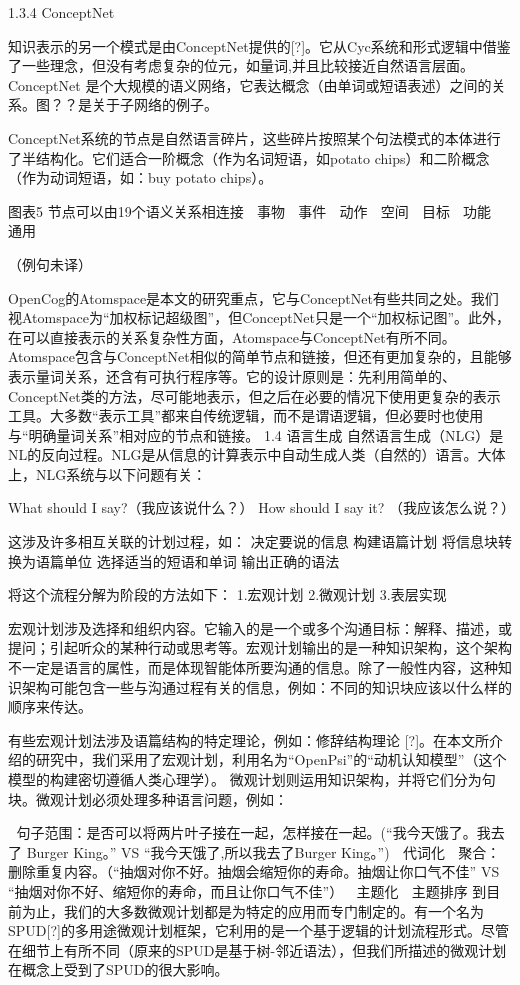 1.3.4 ConceptNet

知识表示的另一个模式是由ConceptNet提供的[?]。它从Cyc系统和形式逻辑中借鉴了一些理念，但没有考虑复杂的位元，如量词,并且比较接近自然语言层面。ConceptNet 是个大规模的语义网络，它表达概念（由单词或短语表述）之间的关系。图？？是关于子网络的例子。

ConceptNet系统的节点是自然语言碎片，这些碎片按照某个句法模式的本体进行了半结构化。它们适合一阶概念（作为名词短语，如potato chips）和二阶概念（作为动词短语，如：buy potato chips）。

图表5
节点可以由19个语义关系相连接
	事物
	事件
	动作
	空间
	目标
	功能
	通用

（例句未译）
 
OpenCog的Atomspace是本文的研究重点，它与ConceptNet有些共同之处。我们视Atomspace为“加权标记超级图”，但ConceptNet只是一个“加权标记图”。此外，在可以直接表示的关系复杂性方面，Atomspace与ConceptNet有所不同。Atomspace包含与ConceptNet相似的简单节点和链接，但还有更加复杂的，且能够表示量词关系，还含有可执行程序等。它的设计原则是：先利用简单的、ConceptNet类的方法，尽可能地表示，但之后在必要的情况下使用更复杂的表示工具。大多数“表示工具”都来自传统逻辑，而不是谓语逻辑，但必要时也使用与“明确量词关系”相对应的节点和链接。
1.4 语言生成
自然语言生成（NLG）是NL的反向过程。NLG是从信息的计算表示中自动生成人类（自然的）语言。大体上，NLG系统与以下问题有关：


What should I say?（我应该说什么？）
How should I say it? （我应该怎么说？）

这涉及许多相互关联的计划过程，如：
决定要说的信息
构建语篇计划
将信息块转换为语篇单位
选择适当的短语和单词
输出正确的语法

将这个流程分解为阶段的方法如下：
1.宏观计划
2.微观计划
3.表层实现

宏观计划涉及选择和组织内容。它输入的是一个或多个沟通目标：解释、描述，或提问；引起听众的某种行动或思考等。宏观计划输出的是一种知识架构，这个架构不一定是语言的属性，而是体现智能体所要沟通的信息。除了一般性内容，这种知识架构可能包含一些与沟通过程有关的信息，例如：不同的知识块应该以什么样的顺序来传达。


有些宏观计划法涉及语篇结构的特定理论，例如：修辞结构理论 [?]。在本文所介绍的研究中，我们采用了宏观计划，利用名为“OpenPsi”的“动机认知模型”（这个模型的构建密切遵循人类心理学）。
微观计划则运用知识架构，并将它们分为句块。微观计划必须处理多种语言问题，例如：

	句子范围：是否可以将两片叶子接在一起，怎样接在一起。(“我今天饿了。我去了 Burger King。” VS “我今天饿了,所以我去了Burger King。”)
	代词化
	聚合：删除重复内容。（“抽烟对你不好。抽烟会缩短你的寿命。抽烟让你口气不佳” VS “抽烟对你不好、缩短你的寿命，而且让你口气不佳”）
	主题化
	主题排序
到目前为止，我们的大多数微观计划都是为特定的应用而专门制定的。有一个名为SPUD[?]的多用途微观计划框架，它利用的是一个基于逻辑的计划流程形式。尽管在细节上有所不同（原来的SPUD是基于树-邻近语法），但我们所描述的微观计划在概念上受到了SPUD的很大影响。

